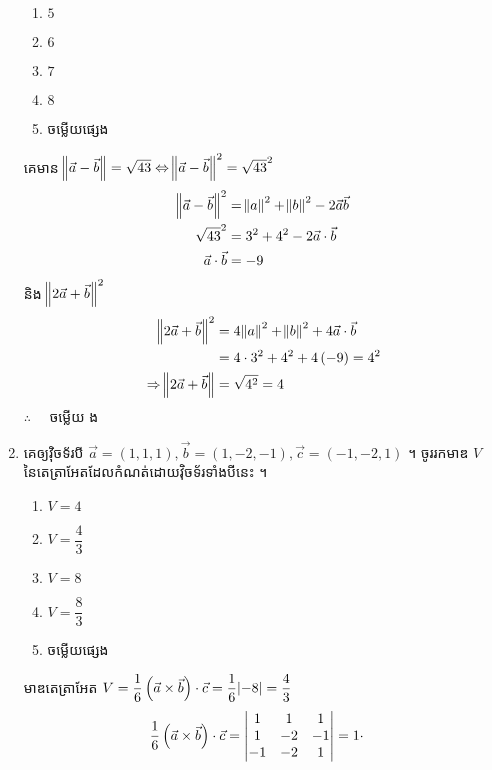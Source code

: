 \documentclass[a4paper,12pt]{article}
\begin{document}
\begin{enumerate}[m]
	\begin{enumerate}[k,5]
		\item $5$
		\item $6$
		\item $7$
		\item $8$
		\item ចម្លើយផ្សេង
	\end{enumerate}
	\answer
	\begin{center}
		គេមាន $\norm{\vec{a}-\vec{b}}=\sqrt{43}\Leftrightarrow \norm{\vec{a}-\vec{b}}^2=\sqrt{43}^2$
		\begin{align*}
			\norm{\vec{a}-\vec{b}}^2&=\norm{a}^2+\norm{b}^2-2\vec{a}\vec{b}\\
			\sqrt{43}^2&=3^2+4^2-2\vec{a}\cdot \vec{b}\\
			\vec{a}\cdot \vec{b}&=-9
		\end{align*}
		និង $\norm{2\vec{a}+\vec{b}}^2$
		\begin{align*}
		\norm{2\vec{a}+\vec{b}}^2&=4\norm{a}^2+\norm{b}^2+4\vec{a}\cdot \vec{b}\\
		&=4\cdot3^2+4^2+4\left(-9\right)=4^2\\
		\Rightarrow \norm{2\vec{a}+\vec{b}} &= \sqrt{4^2}=4
		\end{align*}
		$\therefore \quad$ \kml ចម្លើយ \kbk ង
	\end{center}
	{\color{blue}\hrulefill}
	\item គេឲ្យវ៉ិចទ័របី $\vec{a}=\left(1,1,1\right),\vec{b}=\left(1,-2,-1\right),\vec{c}=\left(-1,-2,1\right)$ ។ ចូររកមាឌ $V$ នៃតេត្រាអែតដែលកំណត់ដោយវ៉ិចទ័រទាំងបីនេះ ។
	\begin{enumerate}[k,5]
		\item $V=4$
		\item $V=\dfrac{4}{3}$
		\item $V=8$
		\item $V=\dfrac{8}{3}$
		\item ចម្លើយផ្សេង
	\end{enumerate}
	\answer
	\begin{center}
		មាឌតេត្រាអែត $V=\dfrac{1}{6}\left(\vec{a}\times\vec{b}\right)\cdot\vec{c}=\dfrac{1}{6}\abs{-8}=\dfrac{4}{3}$
		\begin{eqnarray*}
				\dfrac{1}{6}\left(\vec{a}\times\vec{b}\right)\cdot\vec{c}&=
				\begin{vmatrix}
					1 & 1 & 1\\ 
					1 & -2 & -1 \\ 
					-1 & -2 & 1 \notag
				\end{vmatrix}
				=1\cdot

\end{eqnarray*}
\end{center}
\end{enumerate}
\end{document}
